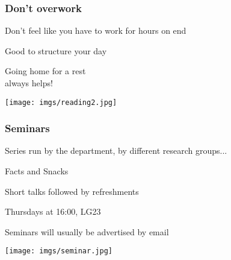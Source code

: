 \documentclass[aspectratio=169]{beamer}
\begin{document}
\begin{frame}
    \frametitle{Don't overwork}
    \centering
    \begin{minipage}{0.4\textwidth}
        \centering
        \Large

        Don't feel like you have to work
        for hours on end

        \vspace{1em}

        Good to \alert{structure} your day

        \vspace{1em}

        Going home for a rest \\
        always helps!
    \end{minipage}
    \qquad
    \begin{minipage}{0.4\textwidth}
        \texttt{[image: imgs/reading2.jpg]}
    \end{minipage}
\end{frame}
\begin{frame}
    \frametitle{Seminars}
    \centering
    \begin{minipage}{0.4\textwidth}
        \centering
        \large

        \vspace{1em}

        Series run by the department, by different research groups...

        \vspace{1em}

        \alert{Facts and Snacks}

        Short talks followed by refreshments

        \alert{Thursdays at 16:00, LG23}

        \vspace{1em}

        Seminars will usually be advertised by \alert{email}
    \end{minipage}
    \qquad
    \begin{minipage}{0.4\textwidth}
        \texttt{[image: imgs/seminar.jpg]}
    \end{minipage}
\end{frame}
\end{document}
